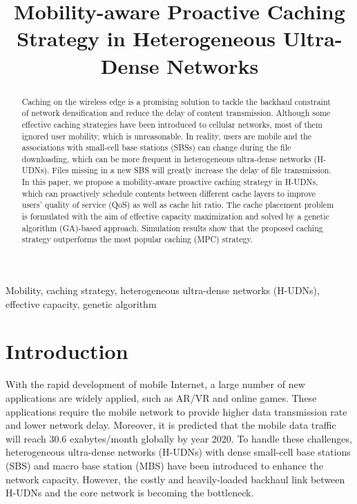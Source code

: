 \documentclass[conference]{IEEEtran}
\begin{document}
\title{Mobility-aware Proactive Caching Strategy in Heterogeneous Ultra-Dense Networks}

\author{


}

\maketitle

\begin{abstract}
Caching on the wireless edge is a promising solution to tackle the backhaul constraint of network densification and reduce the delay of content transmission. Although some effective caching strategies have been introduced to cellular networks, most of them ignored user mobility, which is unreasonable. In reality, users are mobile and the associations with small-cell base stations (SBSs) can change during the file downloading, which can be more frequent in heterogeneous ultra-dense networks (H-UDNs). Files missing in a new SBS will greatly increase the delay of file transmission. In this paper, we propose a mobility-aware proactive caching strategy in H-UDNs, which can proactively schedule contents between different cache layers to improve users’ quality of service (QoS) as well as cache hit ratio. The cache placement problem is formulated with the aim of effective capacity maximization and solved by a genetic algorithm (GA)-based approach. Simulation results show that the proposed caching strategy outperforms the most popular caching (MPC) strategy.
\end{abstract}

\begin{IEEEkeywords}
 Mobility, caching strategy, heterogeneous ultra-dense networks (H-UDNs), effective capacity, genetic algorithm
\end{IEEEkeywords}

\section{Introduction}
With the rapid development of mobile Internet, a large number of new applications are widely applied, such as AR/VR and online games. These applications require the mobile network to provide higher data transmission rate and lower network delay. Moreover, it is predicted that the mobile data traffic will reach 30.6 exabytes/month globally by year 2020\cite{cisco}. To handle these challenges, heterogeneous ultra-dense networks (H-UDNs) with dense small-cell base stations (SBS) and macro base station (MBS) have been introduced to enhance the network capacity. However, the costly and heavily-loaded backhaul link between H-UDNs and the core network is becoming the bottleneck\cite{6963798}.
\end{document}

